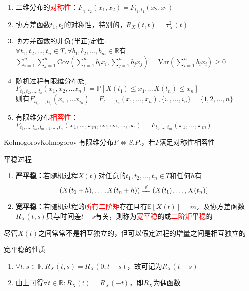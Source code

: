 \documentclass{elegantbook}
\newcommand\var{\text{Var}}
\newcommand\cov{\text{Cov}}
\newcommand\p{\mathbb{P}}
\newcommand\E{\mathbb{E}}
\begin{document}
\begin{enumerate}
    \item 二维分布的\textcolor{red}{对称性}：$F_{t_1,t_2}(x_1,x_2)=F_{t_2,t_1}(x_2,x_1)$
    \item 协方差函数$t_1,t_2$的对称性，特别的，$R_X(t,t)=\sigma _X^2(t)$
    \item 协方差函数的非负(半正)定性:\\
          $\forall t_1,t_2,\dots,t_n\in T,\forall b_1,b_2,\dots,b_m\in \mathbb{R}$有
          \\ $\displaystyle \sum_{i=1}^{n}\sum_{j=1}^{n}\cov \left(\sum_{i=1}^{n}b_i x_i,\sum_{j=1}^{n}b_j x_j\right)=\var \left(\sum_{i=1}^{n}b_i x_i\right)\geq 0$
    \item 随机过程有限维分布族,$F_{t_1,t_2,\dots,t_n}(x_1,x_2,\dots x_n)=\p [X(t_1)\leq x_1,\dots X(t_n)\leq x_n]$
          \\ 则有$F_{t_{i_1},\dots,t_{i_n}}(x_{i_1},\dots x_{i_n})=F_{t_1,\dots,t_n}(x_1,\dots ,x_n),\{i_1,\dots ,i_n\}=\{1,2,\dots ,n\}$
    \item 有限维分布\textcolor{red}{相容性}：$F_{t_1,\dots ,t_m,t_{m+1},\dots ,t_n}(x_1,\dots ,x_m,\infty,\infty,\dots ,\infty)=F_{t_1,\dots ,t_m}(x_1,\dots,x_m)$
\end{enumerate}

\begin{theorem}{Kolmogorov}{Kolmogorov}
    有限维分布$F\Leftrightarrow S.P.$，若$F$满足对称性相容性
\end{theorem}

\begin{definition}{平稳过程}{}
    \begin{enumerate}
        \item {}\textbf{严平稳：}若随机过程$X(t)$对任意的$t_1,t_2,\dots ,t_n\in T$和任何$h$有\[(X(t_1+h),\dots ,X(t_n+h))\xlongequal{d}(X(t_1),\dots ,X(t_n))\]
        \item {}\textbf{宽平稳：}若随机过程的\textcolor{red}{所有二阶矩}存在且有$\E [X(t)]=m$，及协方差函数$R_X(t,s)$只与时间差$t-s$有关，则称为\textcolor{red}{宽平稳}的或\textcolor{red}{二阶矩平稳}的
    \end{enumerate}
    尽管$X(t)$之间常常不是相互独立的，但可以假定过程的增量之间是相互独立的
\end{definition}

\begin{remark}
    宽平稳的性质
    \begin{enumerate}
        \item $\forall t,s\in \mathbb{R},R_X(t,s)=R_X(0,t-s)$，故可记为$R_X(t-s)$
        \item 由上可得$\forall t\in \mathbb{R}:R_X(t)=R_X(-t)$，即$R_X$为偶函数 
    \end{enumerate}
\end{remark}
\end{document}
